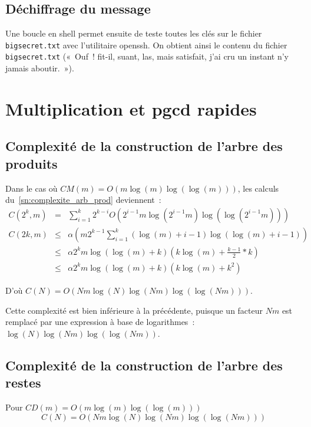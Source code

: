 \documentclass[a4paper,10pt]{article}
\begin{document}
  \subsection{Déchiffrage du message}
  Une boucle en shell permet ensuite de teste toutes les clés sur le fichier \texttt{bigsecret.txt} avec l'utilitaire openssh. On obtient ainsi le contenu du fichier \texttt{bigsecret.txt} («~Ouf~! fit-il, suant, las, mais satisfait, j'ai cru un instant n'y jamais aboutir.~»).

\section{Multiplication et pgcd rapides}
\subsection{Complexité de la construction de l'arbre des produits}
Dans le cas où $CM(m) = O(m\log(m)\log(\log(m)))$, les calculs du~\ref{sn:complexite_arb_prod} deviennent~:
  \begin{eqnarray*}
   C(2^k,m) &=& \sum_{i=1}^k 2^{k-i}O(2^{i-1}m\log(2^{i-1}m)\log(\log(2^{i-1}m)))\\
   C(2k,m) &\leq& \alpha(m2^{k-1}\sum_{i=1}^k(\log(m)+i-1)\log(\log(m)+i-1))\\
   &\leq& \alpha 2^k m \log(\log(m)+k)(k \log(m) + \frac{k-1}{2}*k)\\
   &\leq& \alpha 2^k m \log(\log(m)+k)(k\log(m)+k^2)
  \end{eqnarray*}
  
  D'où $C(N) = O(Nm\log(N)\log(Nm)\log(\log(Nm)))$.
  
  Cette complexité est bien inférieure à la précédente, puisque un facteur $Nm$ est remplacé par une expression à base de logarithmes~: $\log(N)\log(Nm)\log(\log(Nm))$.

  \subsection{Complexité de la construction de l'arbre des restes}
  Pour $CD(m) = O(m\log(m)\log(\log(m)))$
  \[
   C(N) = O(Nm\log(N)\log(Nm)\log(\log(Nm)))
  \]
  
\end{document}

